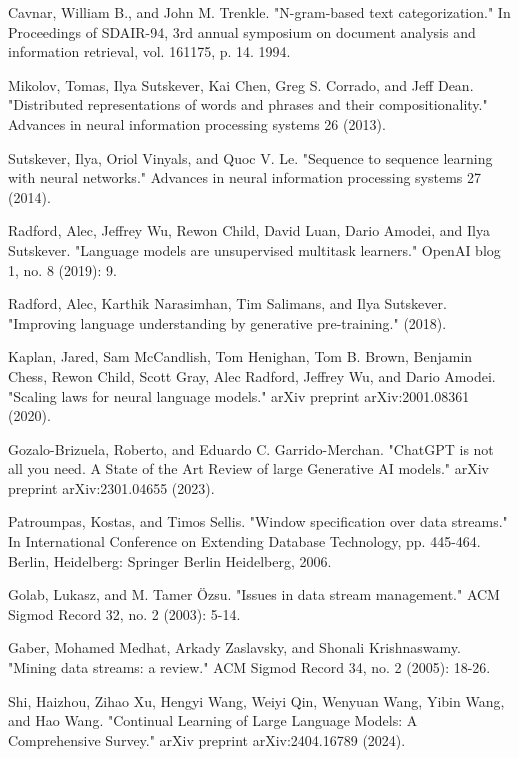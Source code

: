 \documentclass[runningheads]{llncs}
\begin{document}
\begin{thebibliography}{8}
Cavnar, William B., and John M. Trenkle. "N-gram-based text categorization." In Proceedings of SDAIR-94, 3rd annual symposium on document analysis and information retrieval, vol. 161175, p. 14. 1994.

Mikolov, Tomas, Ilya Sutskever, Kai Chen, Greg S. Corrado, and Jeff Dean. "Distributed representations of words and phrases and their compositionality." Advances in neural information processing systems 26 (2013).

Sutskever, Ilya, Oriol Vinyals, and Quoc V. Le. "Sequence to sequence learning with neural networks." Advances in neural information processing systems 27 (2014).

Radford, Alec, Jeffrey Wu, Rewon Child, David Luan, Dario Amodei, and Ilya Sutskever. "Language models are unsupervised multitask learners." OpenAI blog 1, no. 8 (2019): 9.

Radford, Alec, Karthik Narasimhan, Tim Salimans, and Ilya Sutskever. "Improving language understanding by generative pre-training." (2018).

Kaplan, Jared, Sam McCandlish, Tom Henighan, Tom B. Brown, Benjamin Chess, Rewon Child, Scott Gray, Alec Radford, Jeffrey Wu, and Dario Amodei. "Scaling laws for neural language models." arXiv preprint arXiv:2001.08361 (2020).

Gozalo-Brizuela, Roberto, and Eduardo C. Garrido-Merchan. "ChatGPT is not all you need. A State of the Art Review of large Generative AI models." arXiv preprint arXiv:2301.04655 (2023).

Patroumpas, Kostas, and Timos Sellis. "Window specification over data streams." In International Conference on Extending Database Technology, pp. 445-464. Berlin, Heidelberg: Springer Berlin Heidelberg, 2006.

Golab, Lukasz, and M. Tamer Özsu. "Issues in data stream management." ACM Sigmod Record 32, no. 2 (2003): 5-14.

Gaber, Mohamed Medhat, Arkady Zaslavsky, and Shonali Krishnaswamy. "Mining data streams: a review." ACM Sigmod Record 34, no. 2 (2005): 18-26.

Shi, Haizhou, Zihao Xu, Hengyi Wang, Weiyi Qin, Wenyuan Wang, Yibin Wang, and Hao Wang. "Continual Learning of Large Language Models: A Comprehensive Survey." arXiv preprint arXiv:2404.16789 (2024).


\end{thebibliography}
\end{document}
